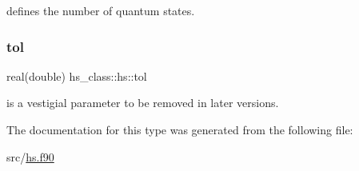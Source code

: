 defines the number of quantum states. 

\mbox{\label{strucths__class_1_1hs_a45c5cb902e23547a231a25fcd34cc621}} 
\subsubsection{\texorpdfstring{tol}{tol}}
{\footnotesize\ttfamily real(double) hs\+\_\+class\+::hs\+::tol\hspace{0.3cm}{\ttfamily [private]}}



is a vestigial parameter to be removed in later versions. 



The documentation for this type was generated from the following file\+:\begin{DoxyCompactItemize}
\item 
src/\hyperlink{hs_8f90}{hs.\+f90}\end{DoxyCompactItemize}
